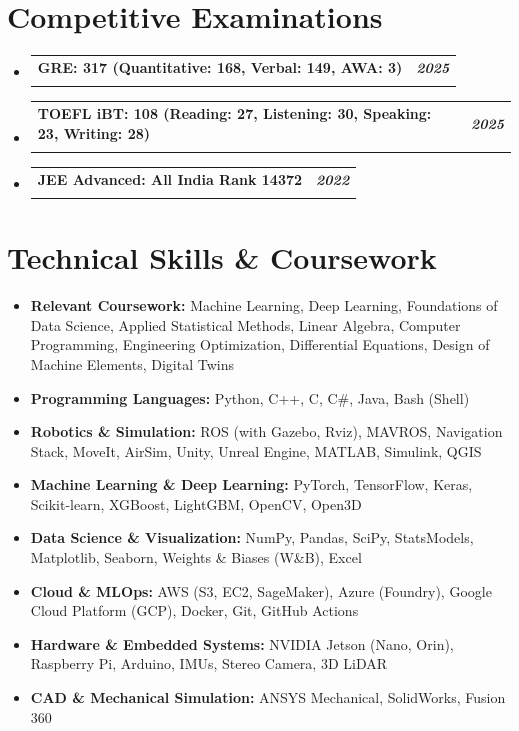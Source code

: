 \documentclass[letterpaper,10pt]{article}
\makeatletter
\newcommand{\resumeSubheading}[4]{
  \vspace{0pt}\item
  \begin{tabular*}{0.97\textwidth}[t]{l@{\extracolsep{\fill}}r}
    \textbf{#1} & \textbf{#2} \\
    \textit{\small #3} & \textit{\small #4} \\
  \end{tabular*}\vspace{-6pt}
}
\newcommand{\resumeSubHeadingListStart}{
  \begin{itemize}[leftmargin=0.10in, label={}]\vspace{6pt}
}
\newcommand{\resumeSubHeadingListEnd}{
  \end{itemize}
}
\newcommand{\nbresumeItemListStart}{
  \begin{itemize}[leftmargin=0.10in, label={}, itemsep=2pt, parsep=2pt]\vspace{6pt}
}
\newcommand{\nbresumeItem}[1]{
  \item \small{#1}
}
\newcommand{\nbresumeItemListEnd}{
  \end{itemize}\vspace{-6pt}
}
\makeatother
\begin{document}
\section{Competitive Examinations}
\resumeSubHeadingListStart
  \resumeSubheading
    {\textbf{GRE:} 317 (Quantitative: 168, Verbal: 149, AWA: 3)}{\mdseries\textit{2025}}
    {}{}
  \vspace{-14pt}

  \resumeSubheading
    {\textbf{TOEFL iBT:} 108 (Reading: 27, Listening: 30, Speaking: 23, Writing: 28)}{\mdseries\textit{2025}}
    {}{}
  \vspace{-14pt}

  \resumeSubheading
    {\textbf{JEE Advanced:} All India Rank 14372}{\mdseries\textit{2022}}
    {}{}
  \vspace{-14pt}

\resumeSubHeadingListEnd

\section{Technical Skills \& Coursework}
\nbresumeItemListStart
  \nbresumeItem{\textbf{Relevant Coursework:} Machine Learning, Deep Learning, Foundations of Data Science, Applied Statistical Methods, Linear Algebra, Computer Programming, Engineering Optimization, Differential Equations, Design of Machine Elements, Digital Twins}
  \nbresumeItem{\textbf{Programming Languages:} Python, C++, C, C\#, Java, Bash (Shell)}
  \nbresumeItem{\textbf{Robotics \& Simulation:} ROS (with Gazebo, Rviz), MAVROS, Navigation Stack, MoveIt, AirSim, Unity, Unreal Engine, MATLAB, Simulink, QGIS}
  \nbresumeItem{\textbf{Machine Learning \& Deep Learning:} PyTorch, TensorFlow, Keras, Scikit-learn, XGBoost, LightGBM, OpenCV, Open3D}
  \nbresumeItem{\textbf{Data Science \& Visualization:} NumPy, Pandas, SciPy, StatsModels, Matplotlib, Seaborn, Weights \& Biases (W\&B), Excel}
  \nbresumeItem{\textbf{Cloud \& MLOps:} AWS (S3, EC2, SageMaker), Azure (Foundry), Google Cloud Platform (GCP), Docker, Git, GitHub Actions}
  \nbresumeItem{\textbf{Hardware \& Embedded Systems:} NVIDIA Jetson (Nano, Orin), Raspberry Pi, Arduino, IMUs, Stereo Camera, 3D LiDAR}
  \nbresumeItem{\textbf{CAD \& Mechanical Simulation:} ANSYS Mechanical, SolidWorks, Fusion 360}
\nbresumeItemListEnd

\newpage
\end{document}
